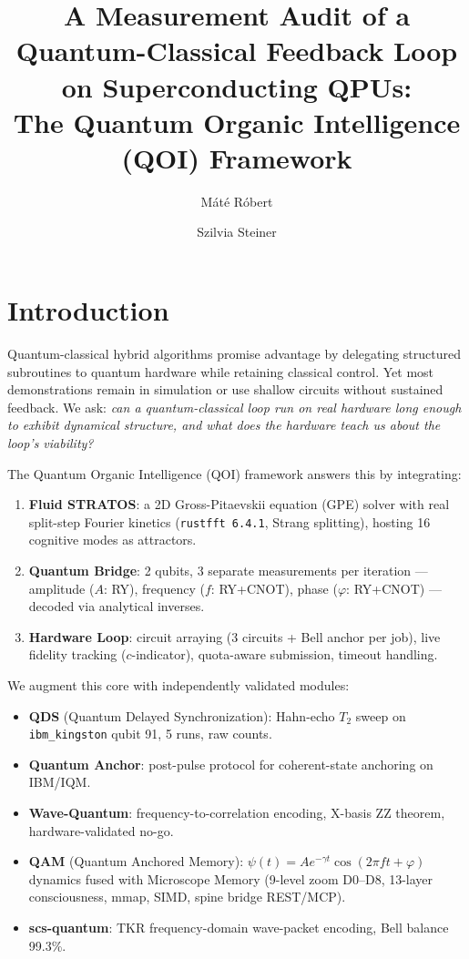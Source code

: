 \documentclass[sigconf,anonymous=false]{acmart}
\title{A Measurement Audit of a Quantum-Classical Feedback Loop on Superconducting QPUs: \\ The Quantum Organic Intelligence (QOI) Framework}
\author{Máté Róbert}
\affiliation{
  \institution{Independent Researcher}
  \streetaddress{Budapest}
  \country{Hungary}
}
\author{Szilvia Steiner}
\affiliation{
  \institution{Independent Researcher}
  \country{Hungary}
}
\begin{document}
\maketitle

\section{Introduction}

Quantum-classical hybrid algorithms promise advantage by delegating structured subroutines to quantum hardware while retaining classical control. Yet most demonstrations remain in simulation or use shallow circuits without sustained feedback. We ask: \emph{can a quantum-classical loop run on real hardware long enough to exhibit dynamical structure, and what does the hardware teach us about the loop's viability?}

The Quantum Organic Intelligence (QOI) framework answers this by integrating:
\begin{enumerate}
\item \textbf{Fluid STRATOS}: a 2D Gross-Pitaevskii equation (GPE) solver with real split-step Fourier kinetics (\texttt{rustfft 6.4.1}, Strang splitting), hosting 16 cognitive modes as attractors.
\item \textbf{Quantum Bridge}: 2 qubits, 3 separate measurements per iteration --- amplitude ($A$: RY), frequency ($f$: RY+CNOT), phase ($\varphi$: RY+CNOT) --- decoded via analytical inverses.
\item \textbf{Hardware Loop}: circuit arraying (3 circuits + Bell anchor per job), live fidelity tracking ($c$-indicator), quota-aware submission, timeout handling.
\end{enumerate}

We augment this core with independently validated modules:
\begin{itemize}
\item \textbf{QDS} (Quantum Delayed Synchronization): Hahn-echo $T_2$ sweep on \texttt{ibm\_kingston} qubit 91, 5 runs, raw counts.
\item \textbf{Quantum Anchor}: post-pulse protocol for coherent-state anchoring on IBM/IQM.
\item \textbf{Wave-Quantum}: frequency-to-correlation encoding, X-basis ZZ theorem, hardware-validated no-go.
\item \textbf{QAM} (Quantum Anchored Memory): $\psi(t) = A e^{-\gamma t} \cos(2\pi f t + \varphi)$ dynamics fused with Microscope Memory (9-level zoom D0--D8, 13-layer consciousness, mmap, SIMD, spine bridge REST/MCP).
\item \textbf{scs-quantum}: TKR frequency-domain wave-packet encoding, Bell balance 99.3\%.
\end{itemize}
\end{document}
